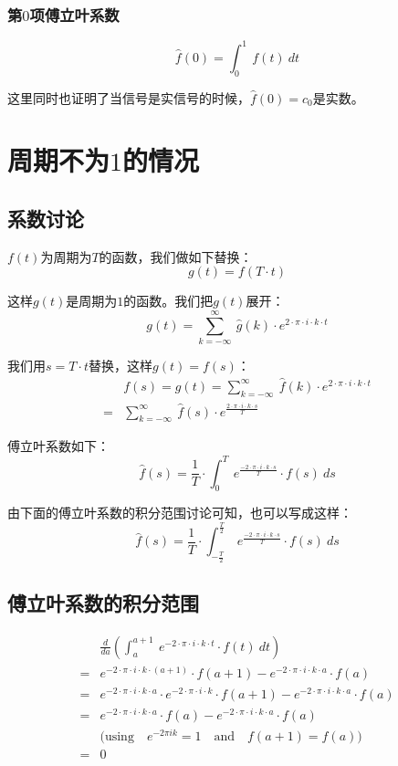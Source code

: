\subsubsection{第$0$项傅立叶系数}
\begin{equation}
	\hat{f}(0)=\int_0^1\ f(t)\ dt
\end{equation}

这里同时也证明了当信号是实信号的时候，$\hat{f}(0)=c_0$是实数。
\section{周期不为$1$的情况}
\subsection{系数讨论}
$f(t)$为周期为$T$的函数，我们做如下替换：
\begin{equation}
	g(t)=f(T\cdot t)
\end{equation}

这样$g(t)$是周期为$1$的函数。我们把$g(t)$展开：
$$
	g(t)=\sum\limits_{k=-\infty}^\infty\ \hat{g}(k)\cdot e^{2\cdot \pi\cdot i\cdot k\cdot t }
$$

我们用$s=T\cdot t$替换，这样$g(t)=f(s)$：
\begin{align*}
	  & f(s)=g(t)=\sum\limits_{k=-\infty}^\infty\ \hat{f}(k)\cdot e^{2\cdot \pi\cdot i\cdot k\cdot t } \\
	= & \sum_{k=-\infty}^\infty\ \hat{f}(s)\cdot e^{\frac{2\cdot\pi\cdot i\cdot k\cdot s}{T}}
\end{align*}

傅立叶系数如下：
$$
	\hat{f}(s)=\frac{1}{T}\cdot \int_0^T\ e^{\frac{-2\cdot\pi\cdot i\cdot k\cdot s}{T}}\cdot f(s)\ ds
$$

由下面的傅立叶系数的积分范围讨论可知，也可以写成这样：
$$
	\hat{f}(s)=\frac{1}{T}\cdot \int_{-\frac{T}{2}}^{\frac{T}{2}}\ e^{\frac{-2\cdot\pi\cdot i\cdot k\cdot s}{T}}\cdot f(s)\ ds
$$
\subsection{傅立叶系数的积分范围}
\begin{align*}
	  & \frac{d}{da}\left(\int_{a}^{a+1}\ e^{-2\cdot \pi\cdot i\cdot k\cdot t}\cdot f(t)\ dt\right)                                        \\
	= & e^{-2\cdot \pi\cdot i\cdot k\cdot (a+1)}\cdot f(a+1)-e^{-2\cdot \pi\cdot i\cdot k\cdot a}\cdot f(a)                                \\
	= & e^{-2\cdot \pi\cdot i\cdot k\cdot a}\cdot e^{-2\cdot \pi\cdot i\cdot k}\cdot f(a+1)-e^{-2\cdot \pi\cdot i\cdot k\cdot a}\cdot f(a) \\
	= & e^{-2\cdot \pi\cdot i\cdot k\cdot a}\cdot f(a)-e^{-2\cdot \pi\cdot i\cdot k\cdot a}\cdot f(a)                                      \\
	  & \text{(using}\quad e^{-2\pi ik}=1\quad \text{and}\quad f(a+1)=f(a))                                                                \\
	= & 0
\end{align*}

